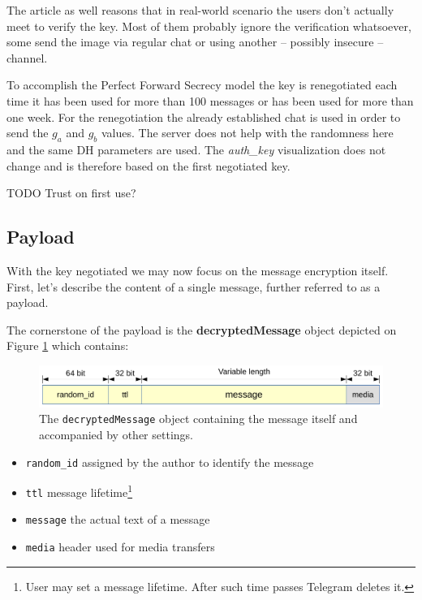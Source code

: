 \documentclass[thesis=M,english]{FITthesis}[2012/10/20]
\begin{document}
The article as well reasons that in real-world scenario the users don't actually meet to verify the key. Most of them probably ignore the verification whatsoever, some send the image via regular chat or using another -- possibly insecure -- channel.

To accomplish the Perfect Forward Secrecy model the key is renegotiated each time it has been used for more than 100 messages or has been used for more than one week. For the renegotiation the already established chat is used in order to send the $g_a$ and $g_b$ values. The server does not help with the randomness here and the same DH parameters are used. The \emph{auth\_key} visualization does not change and is therefore based on the first negotiated key.

TODO Trust on first use?

\subsection{Payload}

With the key negotiated we may now focus on the message encryption itself. First, let's describe the content of a single message, further referred to as a payload.

The cornerstone of the payload is the \textbf{decryptedMessage} object depicted on Figure \ref{img:decrypted-message} which contains:

\begin{figure}[htb]
	\centering
	\includegraphics[width=1\textwidth]{decrypted-message.pdf}
	\caption{The \texttt{decryptedMessage} object containing the message itself and accompanied by other settings.}
	\label{img:decrypted-message}
\end{figure}

\begin{itemize}
	\item \texttt{random\_id} assigned by the author to identify the message
	\item \texttt{ttl} message lifetime\footnote{User may set a message lifetime. After such time passes Telegram deletes it.}
	\item \texttt{message} the actual text of a message
	\item \texttt{media} header used for media transfers
\end{itemize}
\end{document}
